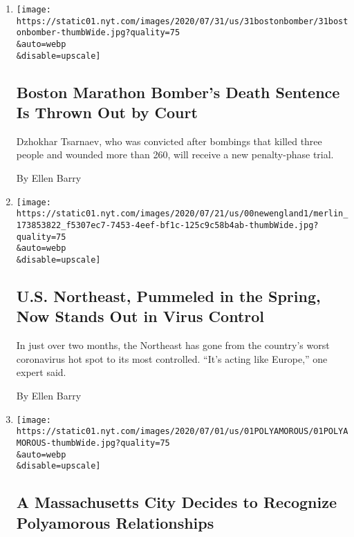 \begin{enumerate}
\def\labelenumi{\arabic{enumi}.}
\item
  \href{/2020/07/31/us/dzhokhar-tsarnaev-boston-marathon-bomber.html}{}

  \texttt{[image: https://static01.nyt.com/images/2020/07/31/us/31bostonbomber/31bostonbomber-thumbWide.jpg?quality=75\\\&auto=webp\\\&disable=upscale]}

  \hypertarget{boston-marathon-bombers-death-sentence-is-thrown-out-by-court}{%
  \subsection{Boston Marathon Bomber's Death Sentence Is Thrown Out by
  Court}\label{boston-marathon-bombers-death-sentence-is-thrown-out-by-court}}

  Dzhokhar Tsarnaev, who was convicted after bombings that killed three
  people and wounded more than 260, will receive a new penalty-phase
  trial.

  By Ellen Barry
\item
  \href{/2020/07/22/us/coronavirus-northeast-governors.html}{}

  \texttt{[image: https://static01.nyt.com/images/2020/07/21/us/00newengland1/merlin\_173853822\_f5307ec7-7453-4eef-bf1c-125c9c58b4ab-thumbWide.jpg?quality=75\\\&auto=webp\\\&disable=upscale]}

  \hypertarget{us-northeast-pummeled-in-the-spring-now-stands-out-in-virus-control}{%
  \subsection{U.S. Northeast, Pummeled in the Spring, Now Stands Out in
  Virus
  Control}\label{us-northeast-pummeled-in-the-spring-now-stands-out-in-virus-control}}

  In just over two months, the Northeast has gone from the country's
  worst coronavirus hot spot to its most controlled. ``It's acting like
  Europe,'' one expert said.

  By Ellen Barry
\item
  \href{/2020/07/01/us/somerville-polyamorous-domestic-partnership.html}{}

  \texttt{[image: https://static01.nyt.com/images/2020/07/01/us/01POLYAMOROUS/01POLYAMOROUS-thumbWide.jpg?quality=75\\\&auto=webp\\\&disable=upscale]}

  \hypertarget{a-massachusetts-city-decides-to-recognize-polyamorous-relationships}{%
  \subsection{A Massachusetts City Decides to Recognize Polyamorous
  Relationships}\label{a-massachusetts-city-decides-to-recognize-polyamorous-relationships}}


\end{enumerate}

